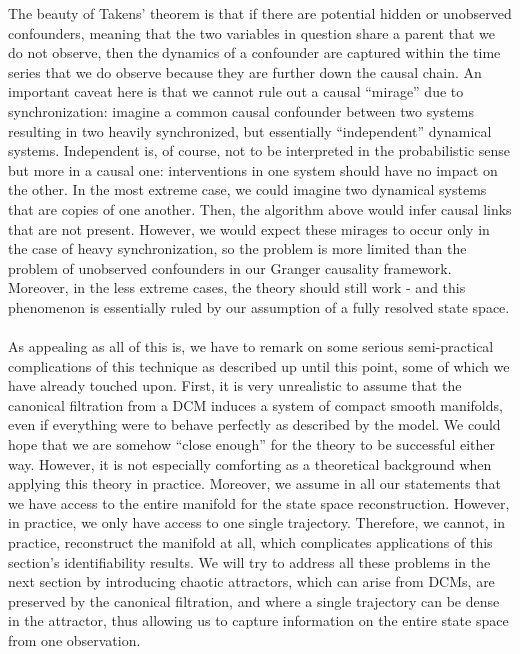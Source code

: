 \documentclass[11pt, a4paper]{memoir}
\theoremstyle{break}
\theoremstyle{break}
\theoremstyle{nonumberplain}
\begin{document}
The beauty of Takens' theorem is that if there are potential hidden or unobserved confounders, meaning that the two variables in question share a parent that we do not observe, then the dynamics of a confounder are captured within the time series that we do observe because they are further down the causal chain. An important caveat here is that we cannot rule out a causal \enquote{mirage} due to synchronization: imagine a common causal confounder between two systems resulting in two heavily synchronized, but essentially \enquote{independent} dynamical systems. Independent is, of course, not to be interpreted in the probabilistic sense but more in a causal one: interventions in one system should have no impact on the other. In the most extreme case, we could imagine two dynamical systems that are copies of one another. Then, the algorithm above would infer causal links that are not present. However, we would expect these mirages to occur only in the case of heavy synchronization, so the problem is more limited than the problem of unobserved confounders in our Granger causality framework. Moreover, in the less extreme cases, the theory should still work - and this phenomenon is essentially ruled by our assumption of a fully resolved state space.\\\\
As appealing as all of this is, we have to remark on some serious semi-practical complications of this technique as described up until this point, some of which we have already touched upon. First, it is very unrealistic to assume that the canonical filtration from a DCM induces a system of compact smooth manifolds, even if everything were to behave perfectly as described by the model. We could hope that we are somehow \enquote{close enough} for the theory to be successful either way. However, it is not especially comforting as a theoretical background when applying this theory in practice. Moreover, we assume in all our statements that we have access to the entire manifold for the state space reconstruction. However, in practice, we only have access to one single trajectory. Therefore, we cannot, in practice, reconstruct the manifold at all, which complicates applications of this section's identifiability results. We will try to address all these problems in the next section by introducing chaotic attractors, which can arise from DCMs, are preserved by the canonical filtration, and where a single trajectory can be dense in the attractor, thus allowing us to capture information on the entire state space from one observation.
\end{document}
